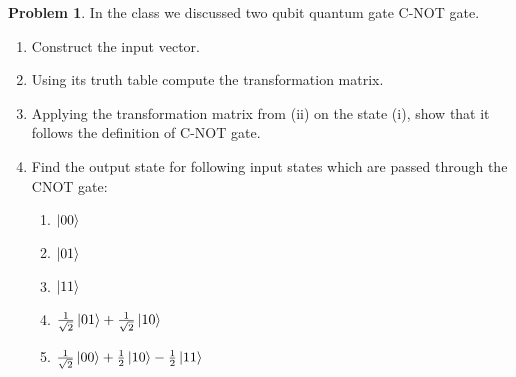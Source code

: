 \documentclass[10pt]{article}
\theoremstyle{definition}
\newtheorem{problem}{Problem}
\begin{document}
\begin{problem}
In the class we discussed two qubit quantum gate C-NOT gate.
\begin{enumerate}[label=(\roman*)]
  \item Construct the input vector.
  \item Using its truth table compute the transformation matrix.
  \item Applying the transformation matrix from (ii) on the state (i), show that it follows the
        definition of C-NOT gate.
  \item Find the output state for following input states which are passed through the CNOT
        gate:
        \begin{enumerate}[label=(\alph*)]
          \item $\ket{00}$
          \item $\ket{01}$
          \item $\ket{11}$
          \item $\frac{1}{\sqrt{2}}\ket{01}+\frac{1}{\sqrt{2}}\ket{10}$
          \item $\frac{1}{\sqrt{2}}\ket{00}+\frac{1}{2}\ket{10}-\frac{1}{2}\ket{11}$
        \end{enumerate}
\end{enumerate}
\end{problem}
\end{document}
